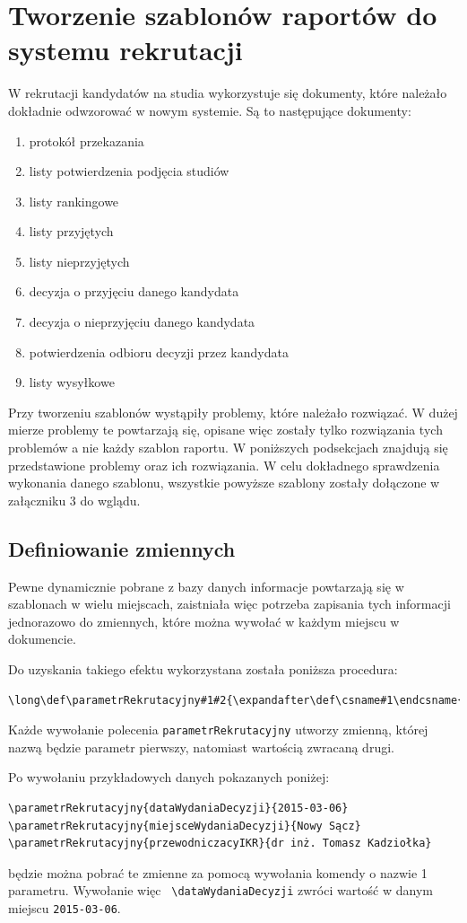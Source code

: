 \section{Tworzenie szablonów raportów do systemu rekrutacji}
W rekrutacji kandydatów na studia wykorzystuje się dokumenty, które należało dokładnie odwzorować w nowym systemie. Są to następujące dokumenty:
\begin{enumerate}
\item protokół przekazania
\item listy potwierdzenia podjęcia studiów 
\item listy rankingowe 
\item listy przyjętych
\item listy nieprzyjętych
\item decyzja o przyjęciu danego kandydata
\item decyzja o nieprzyjęciu danego kandydata 
\item potwierdzenia odbioru decyzji przez kandydata
\item listy wysyłkowe
\end{enumerate}
\vspace{5mm}
\par
Przy tworzeniu szablonów wystąpiły problemy, które należało rozwiązać.  W dużej mierze problemy te powtarzają się,  opisane więc zostały tylko rozwiązania tych problemów a nie każdy szablon raportu. W poniższych podsekcjach znajdują się przedstawione problemy oraz ich rozwiązania. W celu dokładnego sprawdzenia wykonania danego szablonu, wszystkie powyższe szablony zostały dołączone w załączniku 3 do wglądu.
\subsection{Definiowanie zmiennych}

Pewne dynamicznie pobrane z bazy danych informacje powtarzają się w szablonach w wielu miejscach, zaistniała więc potrzeba zapisania tych informacji jednorazowo do zmiennych, które można wywołać w każdym miejscu w dokumencie. 

Do uzyskania takiego efektu wykorzystana została poniższa procedura:
 \begin{lstlisting}
\long\def\parametrRekrutacyjny#1#2{\expandafter\def\csname#1\endcsname{#2}}
 \end{lstlisting}
Każde wywołanie polecenia \texttt{parametrRekrutacyjny} utworzy zmienną, której nazwą będzie parametr pierwszy, natomiast wartością zwracaną drugi.
\par 
Po wywołaniu przykładowych danych pokazanych poniżej:
 \begin{lstlisting}
\parametrRekrutacyjny{dataWydaniaDecyzji}{2015-03-06}
\parametrRekrutacyjny{miejsceWydaniaDecyzji}{Nowy Sącz}
\parametrRekrutacyjny{przewodniczacyIKR}{dr inż. Tomasz Kadziołka}
 \end{lstlisting}
będzie można pobrać te zmienne za pomocą wywołania komendy o nazwie 1 parametru. Wywołanie więc \texttt{ \textbackslash dataWydaniaDecyzji} zwróci wartość w danym miejscu \texttt{2015-03-06}.

